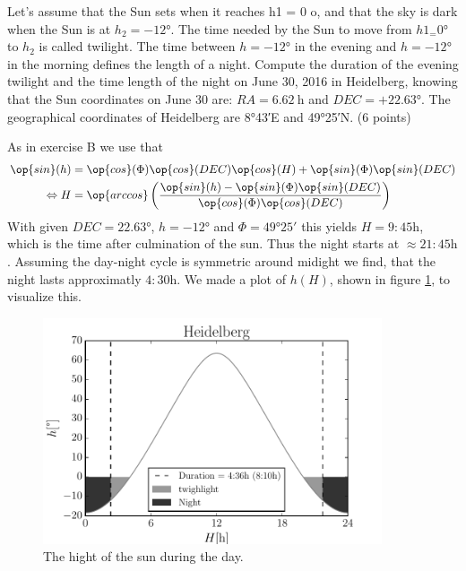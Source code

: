 \documentclass[11pt,a4paper,twoside]{article}
\begin{document}
Let's assume that the Sun sets when it reaches h1 = 0 o, and that the sky is
dark when the Sun is at $h_2 = \ang{-12}$. The time needed by the Sun to 
move from $h1_ = \ang{0}$ to $h_2$ is called twilight. The time between 
$h = \ang{-12}$ in the evening and $h = \ang{-12}$ in the 
morning defines the length of a night.
Compute the duration of the evening twilight and the time length of the night 
on June 30, 2016 in Heidelberg, knowing that the Sun coordinates on June 30 
are: $RA = \SI{6.62}{\hour}$ and $DEC = +\ang{22.63}.$
The geographical coordinates of Heidelberg are \ang{8;43;}E and \ang{49;25;}N. (6 points)

As in exercise B we use that 
\begin{align}
    \op{sin}(h) &=  \op{cos}(\Phi)\op{cos}(DEC)\op{cos}(H) + 
                    \op{sin}(\Phi)\op{sin}(DEC) \\
    \Leftrightarrow H &=   \op{arccos} \left(
                            \frac{\op{sin}(h) - \op{sin}(\Phi)\op{sin}(DEC)}
                                 {\op{cos}(\Phi)\op{cos}(DEC)} \right)
\end{align}
With given $DEC = \ang{22.63}$, $h = \ang{-12}$ and $\Phi = \ang{49;25;}$ 
this yields $H = 9:45\si{\hour}$, which is the time after culmination of the 
sun. Thus the night starts at $\approx 21:45\si{\hour}$. Assuming the day-night 
cycle is symmetric around midight we find, that the night lasts approximatly
$4:30 \si{\hour}$. We made a plot of $h(H)$, shown in figure \ref{fig:h}, 
to visualize this.

\begin{figure}
\centering
\includegraphics[width=10cm]{pic/night}
\caption{The hight of the sun during the day.}
\label{fig:h}
\end{figure}
\end{document}
